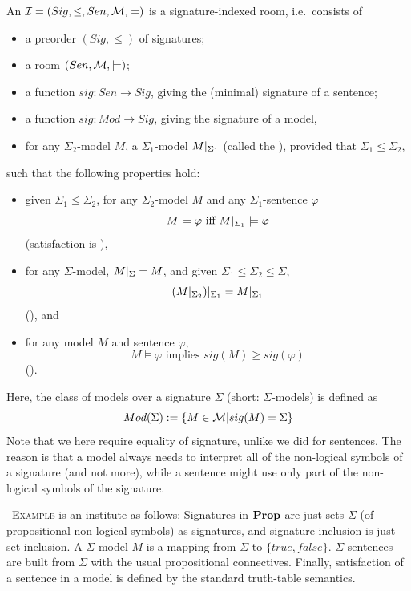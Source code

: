 \documentclass[10pt,%
\ifpretendfinal
final%
\else
draft%
\fi,
]{scrreprt}
\newenvironment{example}[0]{\ \newline \textsc{Example}\quad }{}
\begin{document}
\begin{definition}\label{def:sigroom}
An  ${\cal I}=(Sig,\leq,Sen,{\cal M},\models)$ is a signature-indexed room, i.e.\ consists of
\begin{itemize}
\item a preorder $(Sig,\leq)$ of signatures;
\item a room $(Sen,{\cal M},\models)$;
\item a function $sig: Sen\to Sig$, giving the (minimal) signature
of a sentence;
\item a function $sig: Mod\to Sig$, giving the signature
of a model, 
\item for any $\Sigma_2$-model $M$, a $\Sigma_1$-model
  $M|_{\Sigma_1}$ (called the ), provided that
  $\Sigma_1\leq\Sigma_2$,
\end{itemize}
such that the following properties hold:
\begin{itemize}
\item given $\Sigma_1\leq\Sigma_2$, for any $\Sigma_2$-model $M$
and any $\Sigma_1$-sentence $\varphi$
$$M\models\varphi\mbox{ iff }M|_{\Sigma_1}\models\varphi$$
(satisfaction is ),
\item for any $\Sigma$-model, $M|_{\Sigma}=M$, 
and given $\Sigma_1\leq\Sigma_2\leq\Sigma$, 
$$(M|_{\Sigma_2})|_{\Sigma_1}=M|_{\Sigma_1}$$ 
(), and
\item for any model $M$ and sentence $\varphi$,
$$M\models\varphi\mbox{ implies }sig(M)\geq sig(\varphi)$$
().
\end{itemize}
\end{definition}
Here, the class of models over a signature $\Sigma$ (short:
$\Sigma$-models) is defined as 
$$Mod(\Sigma):=\{M\in{\cal M} | sig(M)=\Sigma\}$$ 
Note that we here require equality of signature, unlike we
did for sentences.  The reason is that a model always needs to
interpret all of the non-logical symbols of a signature (and not more), while a
sentence might use only part of the non-logical symbols of the signature.

\begin{example}\label{Prop} 
   is an institute as follows: Signatures in $\mathbf{Prop}$ are just sets
  $\Sigma$ (of propositional non-logical symbols) as signatures, and signature
  inclusion is just set inclusion. A $\Sigma$-model $M$ is a mapping
  from $\Sigma$ to $\{\mathit{true},\mathit{false}\}$.
  $\Sigma$-sentences are built from $\Sigma$ with the usual
  propositional connectives.  Finally, satisfaction of a sentence in a
  model is defined by the standard truth-table semantics.
\end{example}
\end{document}
